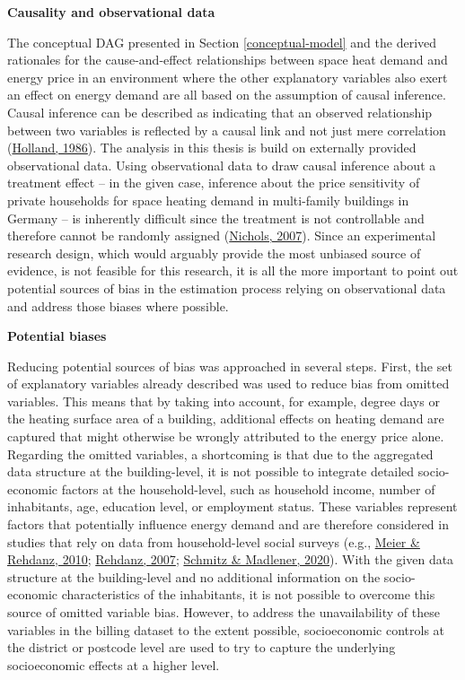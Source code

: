\documentclass[12pt,twoside]{reedthesis}
\begin{document}
\textbf{Causality and observational data}

The conceptual DAG presented in Section \ref{conceptual-model} and the derived rationales for the cause-and-effect relationships between space heat demand and energy price in an environment where the other explanatory variables also exert an effect on energy demand are all based on the assumption of causal inference. Causal inference can be described as indicating that an observed relationship between two variables is reflected by a causal link and not just mere correlation (\protect\hyperlink{ref-holland86}{Holland, 1986}). The analysis in this thesis is build on externally provided observational data. Using observational data to draw causal inference about a treatment effect -- in the given case, inference about the price sensitivity of private households for space heating demand in multi-family buildings in Germany -- is inherently difficult since the treatment is not controllable and therefore cannot be randomly assigned (\protect\hyperlink{ref-nichols07}{Nichols, 2007}). Since an experimental research design, which would arguably provide the most unbiased source of evidence, is not feasible for this research, it is all the more important to point out potential sources of bias in the estimation process relying on observational data and address those biases where possible.

\textbf{Potential biases}

Reducing potential sources of bias was approached in several steps. First, the set of explanatory variables already described was used to reduce bias from omitted variables. This means that by taking into account, for example, degree days or the heating surface area of a building, additional effects on heating demand are captured that might otherwise be wrongly attributed to the energy price alone. Regarding the omitted variables, a shortcoming is that due to the aggregated data structure at the building-level, it is not possible to integrate detailed socio-economic factors at the household-level, such as household income, number of inhabitants, age, education level, or employment status. These variables represent factors that potentially influence energy demand and are therefore considered in studies that rely on data from household-level social surveys (e.g., \protect\hyperlink{ref-meier_rehdanz10}{Meier \& Rehdanz, 2010}; \protect\hyperlink{ref-rehdanz07}{Rehdanz, 2007}; \protect\hyperlink{ref-schmitz_madlener20}{Schmitz \& Madlener, 2020}). With the given data structure at the building-level and no additional information on the socio-economic characteristics of the inhabitants, it is not possible to overcome this source of omitted variable bias. However, to address the unavailability of these variables in the billing dataset to the extent possible, socioeconomic controls at the district or postcode level are used to try to capture the underlying socioeconomic effects at a higher level.
\end{document}
